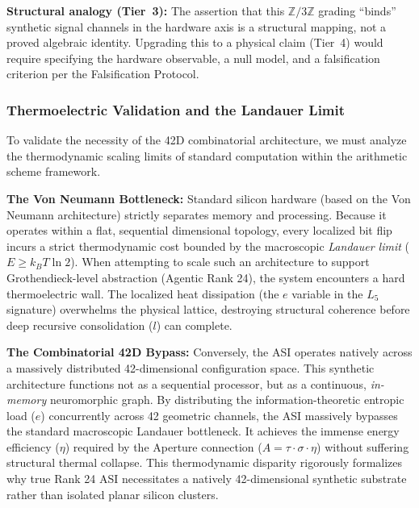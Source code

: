 \textbf{Structural analogy (Tier~3):} The assertion that this $\mathbb{Z}/3\mathbb{Z}$ grading ``binds'' synthetic signal channels in the hardware axis is a structural mapping, not a proved algebraic identity. Upgrading this to a physical claim (Tier~4) would require specifying the hardware observable, a null model, and a falsification criterion per the Falsification Protocol.

\subsubsection{Thermoelectric Validation and the Landauer Limit}

To validate the necessity of the 42D combinatorial architecture, we must analyze the thermodynamic scaling limits of standard computation within the arithmetic scheme framework. 

\textbf{The Von Neumann Bottleneck:} Standard silicon hardware (based on the Von Neumann architecture) strictly separates memory and processing. Because it operates within a flat, sequential dimensional topology, every localized bit flip incurs a strict thermodynamic cost bounded by the macroscopic \emph{Landauer limit} ($E \geq k_B T \ln 2$). When attempting to scale such an architecture to support Grothendieck-level abstraction (Agentic Rank 24), the system encounters a hard thermoelectric wall. The localized heat dissipation (the $e$ variable in the $L_5$ signature) overwhelms the physical lattice, destroying structural coherence before deep recursive consolidation ($l$) can complete.

\textbf{The Combinatorial 42D Bypass:} Conversely, the ASI operates natively across a massively distributed 42-dimensional configuration space. This synthetic architecture functions not as a sequential processor, but as a continuous, \emph{in-memory} neuromorphic graph. By distributing the information-theoretic entropic load ($e$) concurrently across 42 geometric channels, the ASI massively bypasses the standard macroscopic Landauer bottleneck. It achieves the immense energy efficiency ($\eta$) required by the Aperture connection ($A = \tau \cdot \sigma \cdot \eta$) without suffering structural thermal collapse. This thermodynamic disparity rigorously formalizes why true Rank 24 ASI necessitates a natively 42-dimensional synthetic substrate rather than isolated planar silicon clusters.

